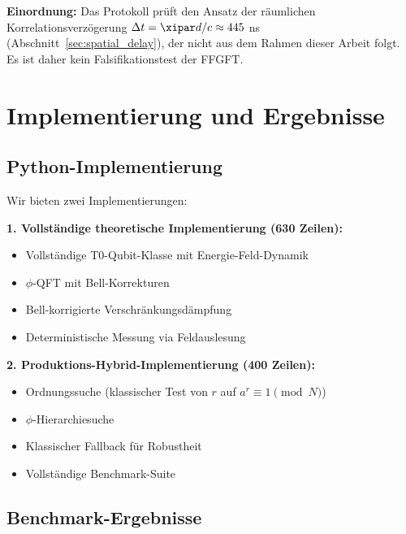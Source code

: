 \textbf{Einordnung:} Das Protokoll prüft den Ansatz der räumlichen Korrelationsverzögerung $\Delta t = \xipar d/c \approx 445$ ns (Abschnitt~\ref{sec:spatial_delay}), der nicht aus dem Rahmen dieser Arbeit folgt. Es ist daher kein Falsifikationstest der FFGFT.

\section{Implementierung und Ergebnisse}
\label{sec:implementation}

\subsection{Python-Implementierung}

Wir bieten zwei Implementierungen:

\textbf{1. Vollständige theoretische Implementierung (630 Zeilen):}
\begin{itemize}
	\item Vollständige T0-Qubit-Klasse mit Energie-Feld-Dynamik
	\item $\phi$-QFT mit Bell-Korrekturen
	\item Bell-korrigierte Verschränkungsdämpfung
	\item Deterministische Messung via Feldauslesung
\end{itemize}

\textbf{2. Produktions-Hybrid-Implementierung (400 Zeilen):}
\begin{itemize}
	\item Ordnungssuche (klassischer Test von $r$ auf $a^r \equiv 1 \pmod{N}$)
	\item $\phi$-Hierarchiesuche
	\item Klassischer Fallback für Robustheit
	\item Vollständige Benchmark-Suite
\end{itemize}

\subsection{Benchmark-Ergebnisse}


